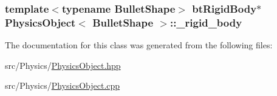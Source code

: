 \subsubsection[{\texorpdfstring{\+\_\+rigid\+\_\+body}{_rigid_body}}]{\setlength{\rightskip}{0pt plus 5cm}template$<$typename Bullet\+Shape$>$ bt\+Rigid\+Body$\ast$ {\bf Physics\+Object}$<$ Bullet\+Shape $>$\+::\+\_\+rigid\+\_\+body\hspace{0.3cm}{\ttfamily [private]}}\hypertarget{classPhysicsObject_a5933d74bff03086c164d94c55cb63352}{}\label{classPhysicsObject_a5933d74bff03086c164d94c55cb63352}


The documentation for this class was generated from the following files\+:\begin{DoxyCompactItemize}
\item 
src/\+Physics/\hyperlink{PhysicsObject_8hpp}{Physics\+Object.\+hpp}\item 
src/\+Physics/\hyperlink{PhysicsObject_8cpp}{Physics\+Object.\+cpp}\end{DoxyCompactItemize}
